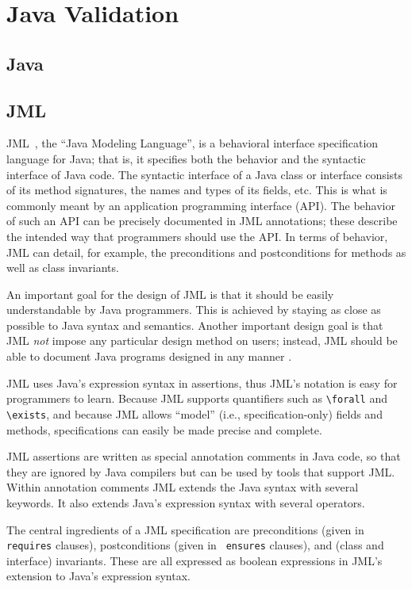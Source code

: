 \chapter{Java Validation}
\section{Java}
\section{JML}
JML~\cite{Leavens-Baker-Ruby99b,Leavens-Baker-Ruby03}, the
``Java Modeling Language'', is a behavioral interface
specification language for Java; that is, it specifies both the behavior
and the syntactic interface of Java code.  The syntactic interface of
a Java class or interface consists of its method signatures,
the names and types of its fields, etc.
This is what is commonly meant by an application programming
interface (API).
The behavior of such an API can be precisely documented in JML annotations;
these describe the intended way that programmers should
use the API.  In terms of behavior, JML can detail, for example, the
preconditions and postconditions for methods as well as class
invariants.

An important goal for the design of JML is that it should be easily
understandable by Java programmers. This is achieved by staying as
close as possible to Java syntax and semantics.  Another important
design goal is that JML {\em not} impose any particular design method
on users; instead, JML should be able to document Java programs
designed in any manner \cite{Leavens-Baker-Ruby03}.

\label{notation}

JML uses Java's expression syntax in assertions,
thus JML's notation is easy for programmers to learn.  
Because JML supports quantifiers such as
\verb_\forall_ and \verb_\exists_, and because JML allows ``model''
(i.e., specification-only) fields and methods, specifications can
easily be made precise and complete.

JML assertions are written as special
annotation comments in Java code,
so that they are ignored by Java compilers but can be used
by tools that support JML\@.  Within annotation comments JML extends the
Java syntax with several keywords.  It also extends Java's expression syntax with several
operators.

The central ingredients of a JML specification are preconditions
(given in {\tt requires} clauses), postconditions (given in {\tt
  ensures} clauses), and (class and interface) invariants.  These are
all expressed as boolean expressions in JML's extension to Java's
expression syntax.

